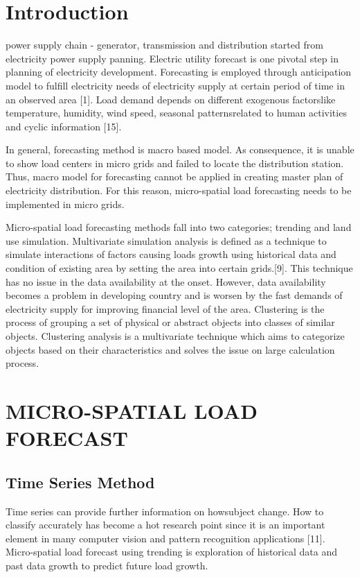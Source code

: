 \documentclass[conference]{IEEEtran}
\begin{document}
\section{Introduction}
 power supply chain - generator, transmission and distribution started from electricity power supply panning. Electric utility forecast is one pivotal step in planning of electricity development. Forecasting is employed through anticipation model to fulfill electricity needs of electricity supply at certain period of time in an observed area [1]. Load demand depends on different exogenous factorslike temperature, humidity, wind speed, seasonal patternsrelated to human activities and cyclic information [15].

In general, forecasting method is macro based model. As consequence, it is unable to show load centers in micro grids and failed to locate the distribution station. Thus, macro model for forecasting cannot be applied in creating master plan of electricity distribution. For this reason, micro-spatial load forecasting needs to be implemented in micro grids.

Micro-spatial load forecasting methods fall into two categories; trending and land use simulation. Multivariate simulation analysis is defined as a technique to simulate interactions of factors causing loads growth using historical data and condition of existing area by setting the area into certain grids.[9]. This technique has no issue in the data availability at the onset. However, data availability becomes a problem in developing country and is worsen by the fast demands of electricity supply for improving financial level of the area. Clustering is the process of grouping a set of physical or abstract objects into classes of similar objects. Clustering analysis is a multivariate technique which aims to categorize objects based on their characteristics and solves the issue on large calculation process.

\section{MICRO-SPATIAL LOAD FORECAST}
\subsection{Time Series Method}
Time series can provide further information on howsubject change. How to classify accurately has become a hot research point since it is an important element in many computer vision and pattern recognition applications [11]. Micro-spatial load forecast using trending is exploration of historical data and past data growth to predict future load growth. 
\end{document}

